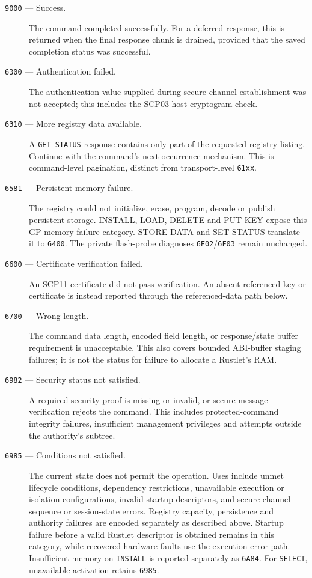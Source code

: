 \begin{description}
\item[\texttt{9000} --- Success.]
The command completed successfully. For a deferred response, this is returned
when the final response chunk is drained, provided that the saved completion
status was successful.

\item[\texttt{6300} --- Authentication failed.]
The authentication value supplied during secure-channel establishment was
not accepted; this includes the SCP03 host cryptogram check.

\item[\texttt{6310} --- More registry data available.]
A \texttt{GET STATUS} response contains only part of the requested registry
listing. Continue with the command's next-occurrence mechanism. This is
command-level pagination, distinct from transport-level \texttt{61xx}.

\item[\texttt{6581} --- Persistent memory failure.]
The registry could not initialize, erase, program, decode or publish persistent
storage. INSTALL, LOAD, DELETE and PUT KEY expose this GP memory-failure
category. STORE DATA and SET STATUS translate it to \texttt{6400}.
The private flash-probe diagnoses \texttt{6F02}/\texttt{6F03} remain unchanged.

\item[\texttt{6600} --- Certificate verification failed.]
An SCP11 certificate did not pass verification. An absent referenced key or
certificate is instead reported through the referenced-data path below.

\item[\texttt{6700} --- Wrong length.]
The command data length, encoded field length, or response/state buffer
requirement is unacceptable. This also covers bounded ABI-buffer staging
failures; it is not the status for failure to allocate a Rustlet's RAM.

\item[\texttt{6982} --- Security status not satisfied.]
A required security proof is missing or invalid, or secure-message verification
rejects the command. This includes protected-command integrity failures,
insufficient management privileges and attempts outside the authority's subtree.

\item[\texttt{6985} --- Conditions not satisfied.]
The current state does not permit the operation. Uses include unmet lifecycle
conditions, dependency restrictions, unavailable execution or isolation
configurations, invalid startup descriptors, and secure-channel sequence or
session-state errors. Registry capacity, persistence and authority failures
are encoded separately as described above. Startup failure
before a valid Rustlet descriptor is obtained remains in this category,
while recovered hardware faults use the execution-error path.
Insufficient memory on \texttt{INSTALL} is reported separately as \texttt{6A84}.
For \texttt{SELECT}, unavailable activation retains \texttt{6985}.


\end{description}
